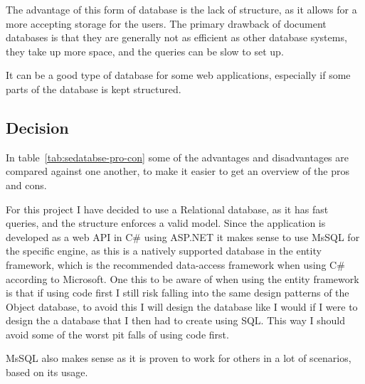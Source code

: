 The advantage of this form of database is the lack of structure, as it allows for a more accepting storage for the users. The primary drawback of document databases is that they are generally not as efficient as other database systems, they take up more space, and the queries can be slow to set up\cite{ibm:choosing_dbms}.

It can be a good type of database for some web applications, especially if some parts of the database is kept structured.


\subsection{Decision }
\label{sub:database_decision}
In table~\ref{tab:sedatabse-pro-con} some of the advantages and disadvantages are compared against one another, to make it easier to get an overview of the pros and cons.

For this project I have decided to use a Relational database, as it has fast queries, and the structure enforces a valid model. Since the application is developed as a web API in C\# using ASP.NET it makes sense to use MsSQL for the specific engine, as this is a natively supported database in the entity framework, which is the recommended data-access framework when using C\# according to Microsoft\cite{entity:microsoft}. One this to be aware of when using the entity framework is that if using code first I still risk falling into the same design patterns of the Object database, to avoid this I will design the database like I would if I were to design the a database that I then had to create using SQL. This way I should avoid some of the worst pit falls of using code first.

MsSQL also makes sense as it is proven to work for others in a lot of scenarios, based on its usage\cite{obdms:gartner}.

\begin{table}[h]
  \caption{Pros and cons of different types of databases}
  \label{tab:sedatabse-pro-con}
\end{table}

